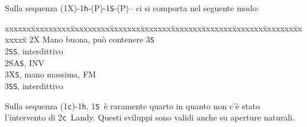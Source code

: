 \documentclass[a4paper,italian]{article}
\newcommand{\BS}{\small{\texttt{S}}}
\newcommand{\BC}{\small{\texttt{c}}}
\newcommand{\BH}{\small{\texttt{h}}}
\newenvironment{bidtable}
{\begin{tabbing}

    xxxxxx\=xxxxxxxxx\=xxxxxxxxx\=xxxxxxx\=xxxxxxx\=xxxxxxx\=xxxxxxx\=xxxxxxx\=xxxxxxx\=xxxxxxx\=\kill}
{\end{tabbing} }%
\newenvironment{sviluppi}
{\begin{tcolorbox}[colframe=azzurro,title=Sviluppi particolari]}
    {
\end{tcolorbox} }%
\begin{document}
\begin{multicols}{2}
    \begin{sviluppi}
        Sulla sequenza (1X)-1\BH-(P)-1\BS-(P)-- ci si comporta nel seguente modo:
        \begin{bidtable}
            2X\> Mano buona, può contenere 3\BS\\
            2\BS{}\BS, interdittivo\\
            2\small{SA}\BS, INV\\
            3X\BS, mano massima, FM\\
            3\BS{}\BS, interdittivo
        \end{bidtable}
        Sulla sequenza (1\BC)-1\BH, 1\BS\ è raramente quarto in quanto non c'è stato l'intervento di 2\BC\ Landy.
        Questi sviluppi sono validi anche su aperture naturali.

    \end{sviluppi}

\end{multicols}
\end{document}
